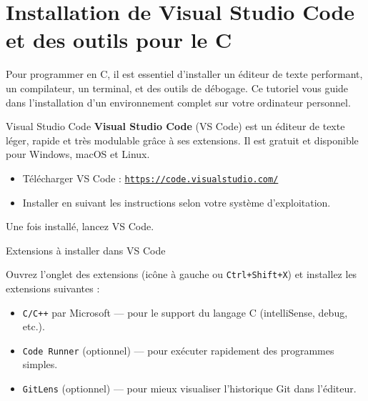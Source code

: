 \documentclass[TP, noCustomPackages]{UPSTI_Document}
\begin{document}

\section*{Installation de Visual Studio Code et des outils pour le C}

Pour programmer en C, il est essentiel d’installer un éditeur de texte performant, un compilateur, un terminal, et des outils de débogage. Ce tutoriel vous guide dans l’installation d’un environnement complet sur votre ordinateur personnel.

\begin{UPSTIinfor}{Visual Studio Code}
\textbf{Visual Studio Code} (VS Code) est un éditeur de texte léger, rapide et très modulable grâce à ses extensions.  
Il est gratuit et disponible pour Windows, macOS et Linux.

\begin{itemize}
    \item Télécharger VS Code : \href{https://code.visualstudio.com/}{\texttt{https://code.visualstudio.com/}}
    \item Installer en suivant les instructions selon votre système d’exploitation.
\end{itemize}

Une fois installé, lancez VS Code.
\end{UPSTIinfor}

\begin{UPSTIinfor}{Extensions à installer dans VS Code}

Ouvrez l’onglet des extensions (icône à gauche ou \texttt{Ctrl+Shift+X}) et installez les extensions suivantes :
\begin{itemize}
    \item \texttt{C/C++} par Microsoft — pour le support du langage C (intelliSense, debug, etc.).
    \item \texttt{Code Runner} (optionnel) — pour exécuter rapidement des programmes simples.
    \item \texttt{GitLens} (optionnel) — pour mieux visualiser l’historique Git dans l’éditeur.
\end{itemize}

\end{UPSTIinfor}
\end{document}
